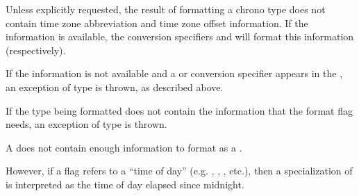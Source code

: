 \pnum
Unless explicitly requested,
the result of formatting a chrono type
does not contain time zone abbreviation
and time zone offset information.
If the information is available,
the conversion specifiers  and 
will format this information (respectively).
\begin{note}
If the information is not available and
a  or 
conversion specifier appears in
the ,
an exception of type  is thrown,
as described above.
\end{note}

\pnum
If the type being formatted does not contain
the information that the format flag needs,
an exception of type  is thrown.
\begin{example}
A  does not contain enough information
to format as a .
\end{example}
However, if a flag refers to a ``time of day''
(e.g. , , , etc.),
then a specialization of  is interpreted as
the time of day elapsed since midnight.


